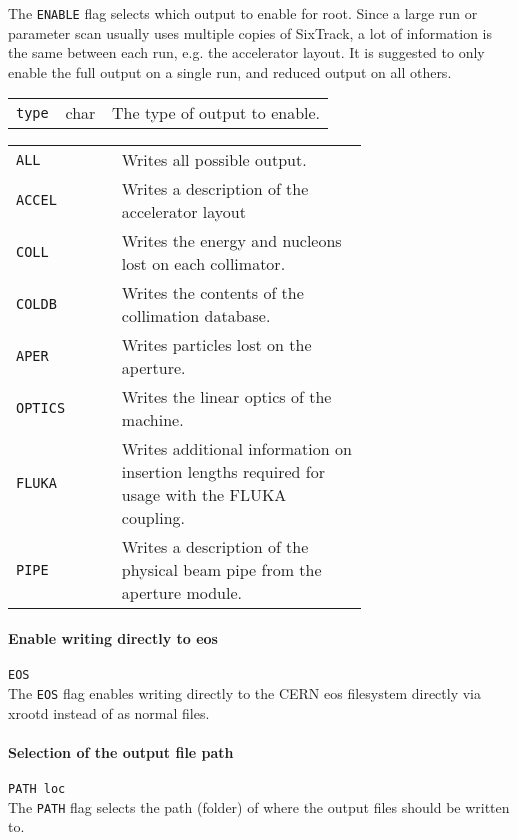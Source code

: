 The \texttt{ENABLE} flag selects which output to enable for root.
Since a large run or parameter scan usually uses multiple copies of SixTrack, a lot of information is the same between each run, e.g. the accelerator layout.
It is suggested to only enable the full output on a single run, and reduced output on all others.


\bigskip
\begin{tabular}{@{}llp{0.7\linewidth}}
    \texttt{type} & char    & The type of output to enable.
\end{tabular}

\bigskip
\begin{tabular}{@{}lp{0.7\linewidth}}
    \texttt{ALL}    & Writes all possible output. \\
    \texttt{ACCEL}  & Writes a description of the accelerator layout \\
    \texttt{COLL}   & Writes the energy and nucleons lost on each collimator. \\
    \texttt{COLDB}  & Writes the contents of the collimation database. \\
    \texttt{APER}   & Writes particles lost on the aperture. \\
    \texttt{OPTICS} & Writes the linear optics of the machine. \\
    \texttt{FLUKA}  & Writes additional information on insertion lengths required for usage with the FLUKA coupling. \\
    \texttt{PIPE}   & Writes a description of the physical beam pipe from the aperture module.
\end{tabular}


\bigskip
\paragraph{Enable writing directly to eos} \texttt{EOS}\\

The \texttt{EOS} flag enables writing directly to the CERN eos filesystem directly via xrootd instead of as normal files.

\bigskip
\paragraph{Selection of the output file path} \texttt{PATH loc}\\

The \texttt{PATH} flag selects the path (folder) of where the output files should be written to. 

